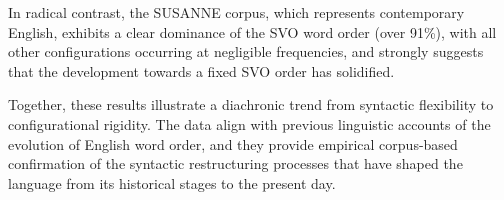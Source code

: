 \documentclass{article}
\begin{document}
In radical contrast, the SUSANNE corpus, which represents contemporary English, exhibits a clear dominance of the SVO word order (over 91\%), with all other configurations occurring at negligible frequencies, and strongly suggests that the development towards a fixed SVO order has solidified.

Together, these results illustrate a diachronic trend from syntactic flexibility to configurational rigidity. The data align with previous linguistic accounts of the evolution of English word order, and they provide empirical corpus-based confirmation of the syntactic restructuring processes that have shaped the language from its historical stages to the present day.

\printbibliography
\end{document}
